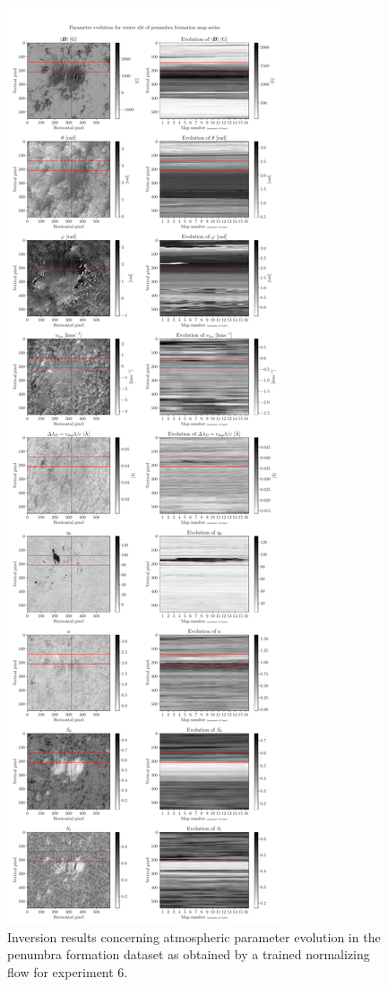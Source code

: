 \documentclass[a4paper,11pt]{report}
\begin{document}
\begin{figure}[h]
\centering
\includegraphics[height=\textheight-1cm]{figures/nf-milne-eddington-example-7-evolution1-nflows-piecewisequadratic.pdf}
\caption{Inversion results concerning atmospheric parameter evolution in the penumbra formation dataset as obtained by a trained normalizing flow for experiment 6.}
\label{fig:nf-milne-eddington-example-7-evolution1-nflows-piecewisequadratic}
\end{figure}
\end{document}
